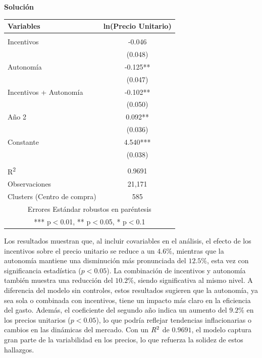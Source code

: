 \documentclass[a4paper, answers, addpoints, 11pt]{exam}
\newenvironment{solucion}{%
  \begin{mdframed}[
    backgroundcolor=blue!5,    %
    linecolor=blue!50,          %
    linewidth=2pt,              %
    leftmargin=10pt,            %
    rightmargin=8pt,           %
    topline=true,              %
    bottomline=true,            %
    roundcorner=10pt,           %
    innerleftmargin=10pt,       %
    innerrightmargin=10pt,      %
    innerbottommargin=10pt,     %
    innertopmargin=10pt         %
  ]%
  \begin{tcolorbox}[colframe=blue!50!black, colback=blue!50, coltitle=white, sharp corners=all, boxrule=1mm, width=\textwidth, halign=left, valign=center, top=0mm, bottom=0mm, left=0mm, right=0mm] \textbf{Solución} \end{tcolorbox} }{\end{mdframed}}
\begin{document}
\begin{enumerate}
\begin{solucion}
\begin{table}[H]
\begin{tabular}{lc}
    Variables & ln(Precio Unitario) \\ \hline
    &  \\
    Incentivos & -0.046 \\
    & (0.048) \\
    Autonomía & -0.125** \\
    & (0.047) \\
    Incentivos + Autonomía & -0.102** \\
    & (0.050) \\
    Año 2 & 0.092** \\
    & (0.036) \\
    Constante & 4.540*** \\
    & (0.038) \\
    &  \\
    R\textsuperscript{2} & 0.9691 \\
    Observaciones & 21,171 \\
    Clusters (Centro de compra) & 585 \\ \hline
    \multicolumn{2}{c}{ Errores Estándar robustos en paréntesis} \\
    \multicolumn{2}{c}{ *** p$<$0.01, ** p$<$0.05, * p$<$0.1} \\
    \end{tabular}
\end{table}
Los resultados muestran que, al incluir covariables en el análisis, el efecto de los incentivos sobre el precio unitario se reduce a un $4.6\%$, mientras que la autonomía mantiene una disminución más pronunciada del $12.5\%$, esta vez con significancia estadística ($p < 0.05$). La combinación de incentivos y autonomía también muestra una reducción del $10.2\%$, siendo significativa al mismo nivel. A diferencia del modelo sin controles, estos resultados sugieren que la autonomía, ya sea sola o combinada con incentivos, tiene un impacto más claro en la eficiencia del gasto. Además, el coeficiente del segundo año indica un aumento del $9.2\%$ en los precios unitarios ($p < 0.05$), lo que podría reflejar tendencias inflacionarias o cambios en las dinámicas del mercado. Con un $R\textsuperscript{2}$ de $0.9691$, el modelo captura gran parte de la variabilidad en los precios, lo que refuerza la solidez de estos hallazgos.

   \end{solucion}
   

\end{enumerate}
\end{document}
